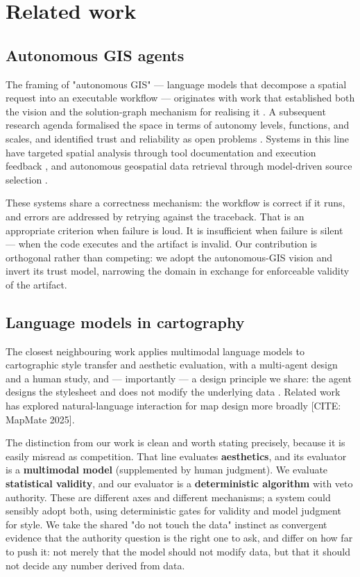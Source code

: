 \section{Related work}
\subsection{Autonomous GIS agents}
The framing of "autonomous GIS" --- language models that decompose a spatial request into an executable workflow --- originates with work that established both the vision and the solution-graph mechanism for realising it \cite{li2023autonomous}. A subsequent research agenda formalised the space in terms of autonomy levels, functions, and scales, and identified trust and reliability as open problems \cite{li2025giscience}. Systems in this line have targeted spatial analysis through tool documentation and execution feedback \cite{akinboyewa2025giscopilot}, and autonomous geospatial data retrieval through model-driven source selection \cite{ning2025llmfind}.

These systems share a correctness mechanism: the workflow is correct if it runs, and errors are addressed by retrying against the traceback. That is an appropriate criterion when failure is loud. It is insufficient when failure is silent --- when the code executes and the artifact is invalid. Our contribution is orthogonal rather than competing: we adopt the autonomous-GIS vision and invert its trust model, narrowing the domain in exchange for enforceable validity of the artifact.

\subsection{Language models in cartography}
The closest neighbouring work applies multimodal language models to cartographic style transfer and aesthetic evaluation, with a multi-agent design and a human study, and --- importantly --- a design principle we share: the agent designs the stylesheet and does not modify the underlying data \cite{wang2025cartoagent}. Related work has explored natural-language interaction for map design more broadly [CITE: MapMate 2025].

The distinction from our work is clean and worth stating precisely, because it is easily misread as competition. That line evaluates \textbf{aesthetics}, and its evaluator is a \textbf{multimodal model} (supplemented by human judgment). We evaluate \textbf{statistical validity}, and our evaluator is a \textbf{deterministic algorithm} with veto authority. These are different axes and different mechanisms; a system could sensibly adopt both, using deterministic gates for validity and model judgment for style. We take the shared "do not touch the data" instinct as convergent evidence that the authority question is the right one to ask, and differ on how far to push it: not merely that the model should not modify data, but that it should not decide any number derived from data.

